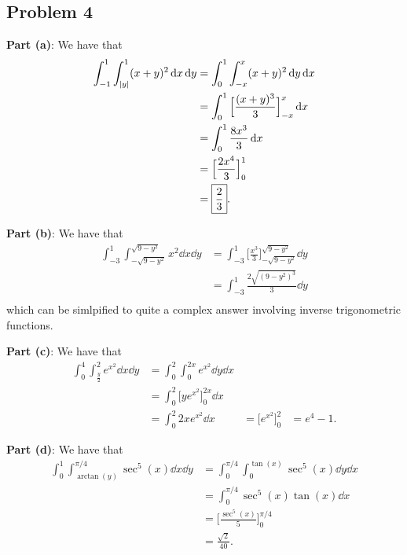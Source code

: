 \documentclass[11pt]{article}
\begin{document}
\subsection*{Problem 4}

\textbf{Part (a)}: We have that
\begin{align*}
	\int_{-1}^{1} \int_{\abs{y}}^{1} (x + y)^{2} \dd{x} \dd{y} &= \int_{0}^{1} \int_{-x}^{x} (x + y)^{2} \dd{y} \dd{x} \\
	&= \int_{0}^{1} \Big[ \frac{(x + y)^{3}}{3} \Big]_{-x}^{x} \dd{x} \\
	&= \int_{0}^{1} \frac{8x^{3}}{3} \dd{x} \\
	&= \Big[ \frac{2x^{4}}{3} \Big]_{0}^{1} \\
	&= \boxed{\frac{2}{3}}.
\end{align*}

\textbf{Part (b)}: We have that
\begin{align*}
	\int_{-3}^{1} \int_{-\sqrt{9-y^{2}}}^{\sqrt{9-y^{2}}} x^{2} \dd{x} \dd{y} &= \int_{-3}^{1} \Big[ \frac{x^{3}}{3} \Big]_{-\sqrt{9-y^{2}}}^{\sqrt{9-y^{2}}} \dd{y} \\
	&= \int_{-3}^{1} \frac{2\sqrt{(9 - y^{2})^{3}}}{3} \dd{y} \\
\end{align*}
which can be simlpified to quite a complex answer involving inverse trigonometric functions. 

\textbf{Part (c)}: We have that
\begin{align*}
	\int_{0}^{4} \int_{\frac{y}{2}}^{2} e^{x^{2}} \dd{x} \dd{y} &= \int_{0}^{2} \int_{0}^{2x} e^{x^{2}} \dd{y} \dd{x} \\
	&= \int_{0}^{2} \Big[ y e^{x^{2}} \Big]_{0}^{2x} \dd{x} \\
	&= \int_{0}^{2} 2x e^{x^{2}} \dd{x} 
	&= \Big[ e^{x^{2}} \Big]_{0}^{2}
	&= \boxed{e^{4} - 1}.
\end{align*}

\textbf{Part (d)}: We have that
\begin{align*}
	\int_{0}^{1} \int_{\arctan(y)}^{\pi/4} \sec^{5}(x) \dd{x} \dd{y} &= \int_{0}^{\pi/4} \int_{0}^{\tan(x)} \sec^{5}(x) \dd{y} \dd{x} \\
	&= \int_{0}^{\pi/4} \sec^{5}(x) \tan(x) \dd{x} \\
	&= \Big[ \frac{\sec^{5}(x)}{5} \Big]_{0}^{\pi/4} \\
	&= \boxed{\frac{\sqrt{2}}{40}}.
\end{align*}

\end{document}
